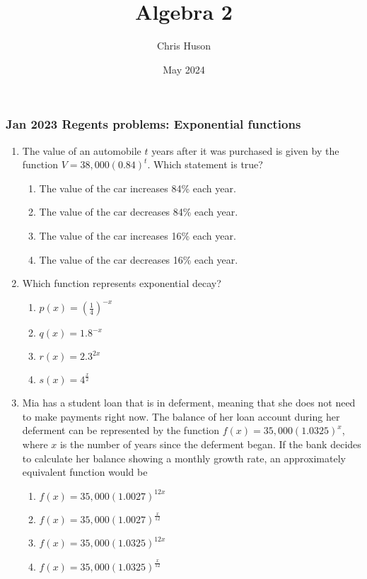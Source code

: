 \documentclass[12pt, twoside]{article}
\title{Algebra 2}
\author{Chris Huson}
\date{May 2024}
\begin{document}
\subsubsection*{Jan 2023 Regents problems: Exponential functions}
\begin{enumerate}[itemsep=0.5cm]
\item The value of an automobile $t$ years after it was purchased is given by the function $V = 38,000(0.84)^t$. Which statement is true? %
\begin{enumerate}
    \item The value of the car increases 84\% each year.
    \item The value of the car decreases 84\% each year.
    \item The value of the car increases 16\% each year.
    \item The value of the car decreases 16\% each year.
\end{enumerate}

\item Which function represents exponential decay? %
\begin{enumerate}
    \item $\displaystyle p(x) = \left(\frac{1}{4}\right)^{-x}$
    \item $q(x) = 1.8^{-x}$
    \item $r(x) = 2.3^{2x}$
    \item $s(x) = 4^{\frac{x}{2}}$
\end{enumerate}

\item  %
Mia has a student loan that is in deferment, meaning that she does
not need to make payments right now. The balance of her loan
account during her deferment can be represented by the function
$f(x) = 35,000 (1.0325)^x$, where $x$ is the number of years since the
deferment began. If the bank decides to calculate her balance showing
a monthly growth rate, an approximately equivalent function would be
\begin{enumerate}
    \item $f(x) = 35,000 (1.0027)^{12x}$
    \item $\displaystyle f(x) = 35,000 (1.0027)^{\frac{x}{12}}$
    \item $f(x) = 35,000 (1.0325)^{12x}$
    \item $\displaystyle f(x) = 35,000 (1.0325)^{\frac{x}{12}}$
\end{enumerate}


\end{enumerate}
\end{document}

